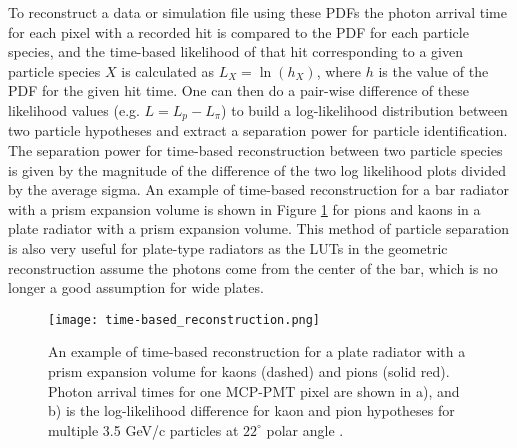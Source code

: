 To reconstruct a data or simulation file using these PDFs the photon arrival time for each pixel with a recorded hit is compared to the PDF for each particle species, and the time-based likelihood of that hit corresponding to a given particle species $X$ is calculated as $L_{X} = \ln(h_{X})$, where $h$ is the value of the PDF for the given hit time. One can then do a pair-wise difference of these likelihood values (e.g. $L = L_{p} - L_{\pi}$) to build a log-likelihood distribution between two particle hypotheses and extract a separation power for particle identification. The separation power for time-based reconstruction between two particle species is given by the magnitude of the difference of the two log likelihood plots divided by the average sigma. An example of time-based reconstruction for a bar radiator with a prism expansion volume is shown in Figure \ref{fig:time-based_reco} for pions and kaons in a plate radiator with a prism expansion volume. This method of particle separation is also very useful for plate-type radiators as the LUTs in the geometric reconstruction assume the photons come from the center of the bar, which is no longer a good assumption for wide plates. 

\begin{figure}[!htb]
	\centering
	\texttt{[image: time-based\_reconstruction.png]}
	\caption[An example of time-based reconstruction for a plate radiator with a prism expansion volume for kaons (dashed) and pions (solid red).]{An example of time-based reconstruction for a plate radiator with a prism expansion volume for kaons (dashed) and pions (solid red). Photon arrival times for one MCP-PMT pixel are shown in a), and b) is the log-likelihood difference for kaon and pion hypotheses for multiple 3.5 GeV/c particles at $22^\circ$ polar angle \cite{PANDA_barrel}.}
	\label{fig:time-based_reco}
\end{figure}
